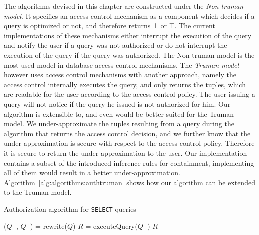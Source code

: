 The algorithms devised in this chapter are constructed under the \emph{Non-truman model}.
%
It specifies an access control mechanism as a component which decides if a query is optimized or not, and therefore returns $\bot$ or $\top$.
%
The current implementations of these mechanisms either interrupt the execution of the query and notify the user if a query was not authorized or do not interrupt the execution of the query if the query was authorized.
%
The Non-truman model is the most used model in database access control mechanisms.
%
The \emph{Truman model} however uses access control mechanisms with another approach, namely the access control internally executes the query, and only returns the tuples, which are readable for the user according to the access control policy.
%
The user issuing a query will not notice if the query he issued is not authorized for him.
%
Our algorithm is extensible to, and even would be better suited for the Truman model.
%
We under-approximate the tuples resulting from a query during the algorithm that returns the access control decision, and we further know that the under-approximation is secure with respect to the access control policy.
%
Therefore it is secure to return the under-approximation to the user.
%
Our implementation contains a subset of the introduced inference rules for containment, implementing all of them would result in a better under-approximation.
%
Algorithm~\ref{alg:algorithms:authtruman} shows how our algorithm can be extended to the Truman model.
%
\begin{algorithm}
\caption{Authorization algorithm for \texttt{SELECT} queries}
\label{alg:algorithms:authtruman}
	\SetAlgoLined
	($Q^\bot$, $Q^\top$) = rewrite($Q$)\;
	$R$ = executeQuery($Q^\top$)\;
	\Return $R$
\end{algorithm}